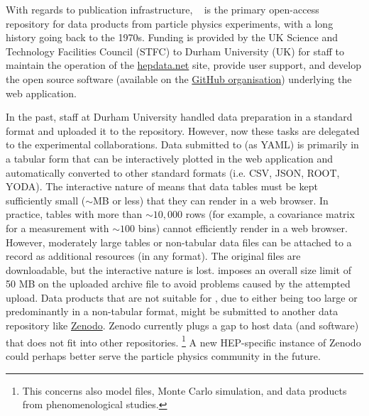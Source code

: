 \documentclass[11pt]{article}
\begin{document}
With regards to publication infrastructure, 
\hepdata~\cite{hepdata} is the primary open-access repository for %
data products from particle physics experiments, with a long history going back to the 1970s.
Funding is provided by the UK Science and Technology Facilities Council (STFC) to Durham University (UK) for staff to maintain the operation of the \href{https://www.hepdata.net/}{hepdata.net} site, provide user support, and develop the open source software (available on the \href{https://github.com/HEPData}{\hepdata GitHub organisation}) underlying the web application.

In the past, \hepdata staff at Durham University handled data preparation in a standard format and uploaded it to the repository.
However, now these tasks are delegated to the experimental collaborations.
Data submitted to \hepdata (as YAML) is primarily in a tabular form that can be interactively plotted in the web application and automatically converted to other standard formats (i.e. CSV, JSON, ROOT, YODA).
The interactive nature of \hepdata means that data tables must be kept sufficiently small ($\sim$MB or less) that they can render in a web browser.
In practice, tables with more than $\sim 10,000$ rows (for example, a covariance matrix for a measurement with $\sim 100$ bins) cannot efficiently render in a web browser.
However, moderately large tables or non-tabular data files can be attached to a \hepdata record as additional resources (in any format).
The original files are downloadable, but the interactive nature is lost.
\hepdata imposes an overall size limit of 50 MB on the uploaded archive file to avoid problems caused by the attempted upload. 
%
Data products that are not suitable for \hepdata, due to either being too large or predominantly in a non-tabular format, might be submitted to another data repository like \href{https://zenodo.org/}{Zenodo}.
Zenodo currently plugs a gap to host data (and software) that does not fit into other repositories.%
\footnote{This concerns also model files, Monte Carlo simulation, and data products from phenomenological studies.}
A new HEP-specific instance of Zenodo could perhaps better serve the particle physics community in the future.
\end{document}
